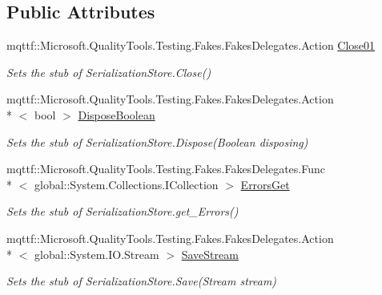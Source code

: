 \subsection*{Public Attributes}
\begin{DoxyCompactItemize}
\item 
mqttf\-::\-Microsoft.\-Quality\-Tools.\-Testing.\-Fakes.\-Fakes\-Delegates.\-Action \hyperlink{class_system_1_1_component_model_1_1_design_1_1_serialization_1_1_fakes_1_1_stub_serialization_store_adc5a8f6eb43aa016bbcc0d95c9507b6c}{Close01}
\begin{DoxyCompactList}\small\item\em Sets the stub of Serialization\-Store.\-Close()\end{DoxyCompactList}\item 
mqttf\-::\-Microsoft.\-Quality\-Tools.\-Testing.\-Fakes.\-Fakes\-Delegates.\-Action\\*
$<$ bool $>$ \hyperlink{class_system_1_1_component_model_1_1_design_1_1_serialization_1_1_fakes_1_1_stub_serialization_store_a0912d62a0f0e8721c612be201391eda4}{Dispose\-Boolean}
\begin{DoxyCompactList}\small\item\em Sets the stub of Serialization\-Store.\-Dispose(\-Boolean disposing)\end{DoxyCompactList}\item 
mqttf\-::\-Microsoft.\-Quality\-Tools.\-Testing.\-Fakes.\-Fakes\-Delegates.\-Func\\*
$<$ global\-::\-System.\-Collections.\-I\-Collection $>$ \hyperlink{class_system_1_1_component_model_1_1_design_1_1_serialization_1_1_fakes_1_1_stub_serialization_store_aa909ff6b962230b88af67fbada4f5451}{Errors\-Get}
\begin{DoxyCompactList}\small\item\em Sets the stub of Serialization\-Store.\-get\-\_\-\-Errors()\end{DoxyCompactList}\item 
mqttf\-::\-Microsoft.\-Quality\-Tools.\-Testing.\-Fakes.\-Fakes\-Delegates.\-Action\\*
$<$ global\-::\-System.\-I\-O.\-Stream $>$ \hyperlink{class_system_1_1_component_model_1_1_design_1_1_serialization_1_1_fakes_1_1_stub_serialization_store_a198f4ee217126ef526649dc8830dc818}{Save\-Stream}
\begin{DoxyCompactList}\small\item\em Sets the stub of Serialization\-Store.\-Save(\-Stream stream)\end{DoxyCompactList}\end{DoxyCompactItemize}

